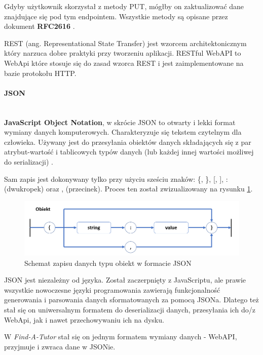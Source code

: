 \documentclass[12pt]{article}
\newcommand{\myparagraph}[1]{\paragraph{#1}\mbox{}\\}
\numberwithin{figure}{section}
\begin{document}
\begin{sloppypar}
        Gdyby użytkownik skorzystał z metody PUT, mógłby on zaktualizować dane znajdujące się pod tym endpointem. Wszystkie metody są opisane przez dokument \textbf{RFC2616} \cite{http}.
        
        REST (ang. Representational State Transfer) jest wzorcem architektonicznym który narzuca dobre praktyki przy tworzeniu aplikacji.
        RESTful WebAPI to WebApi które stosuje się do zasad wzorca REST i jest zaimplementowane na bazie protokołu HTTP.
        
        \myparagraph{JSON}
        \indent
        \textbf{JavaScript Object Notation}, w skrócie JSON to otwarty i lekki format wymiany danych komputerowych. Charakteryzuje się tekstem czytelnym dla człowieka. Używany jest do przesyłania obiektów danych składających się z par atrybut-wartość i tablicowych typów danych (lub każdej innej wartości możliwej do serializacji) \cite{json}.
        
        Sam zapis jest dokonywany tylko przy użyciu sześciu znaków: \{, \}, [, ], : (dwukropek) oraz , (przecinek). Proces ten został zwizualizowany na rysunku \ref{fig:json}.
        
        \begin{figure}[H] 
         	\centering
        	\includegraphics[width=1.0\textwidth]{images/chapter_3/json.png}
        	\caption{Schemat zapisu danych typu obiekt w formacie JSON}
        	\label{fig:json}
        \end{figure}
        
        JSON jest niezależny od języka. Został zaczerpnięty z JavaScriptu, ale prawie wszystkie nowoczesne języki programowania zawierają funkcjonalność generowania i parsowania danych sformatowanych za pomocą JSONa. Dlatego też stał się on uniwersalnym formatem do deserializacji danych, przesyłania ich do/z WebApi, jak i nawet przechowywaniu ich na dysku.
        
        W \textit{Find-A-Tutor} stał się on jednym formatem wymiany danych - WebAPI, przyjmuje i zwraca dane w JSONie. 
        

\end{sloppypar}
\end{document}
